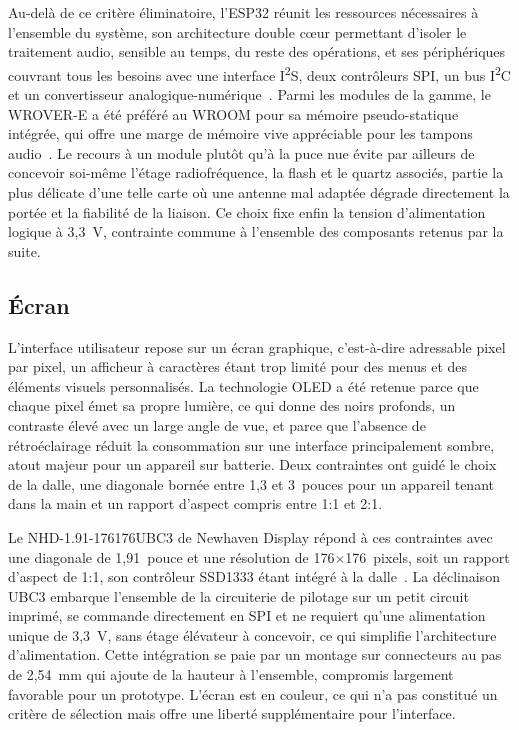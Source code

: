 Au-delà de ce critère éliminatoire, l'ESP32 réunit les ressources nécessaires à l'ensemble du système, son architecture double cœur permettant d'isoler le traitement audio, sensible au temps, du reste des opérations, et ses périphériques couvrant tous les besoins avec une interface I\textsuperscript{2}S, deux contrôleurs SPI, un bus I\textsuperscript{2}C et un convertisseur analogique-numérique~\cite{ESP32_Datasheet}. Parmi les modules de la gamme, le WROVER-E a été préféré au WROOM pour sa mémoire pseudo-statique intégrée, qui offre une marge de mémoire vive appréciable pour les tampons audio~\cite{ESP32_WROVER-E_Datasheet}. Le recours à un module plutôt qu'à la puce nue évite par ailleurs de concevoir soi-même l'étage radiofréquence, la flash et le quartz associés, partie la plus délicate d'une telle carte où une antenne mal adaptée dégrade directement la portée et la fiabilité de la liaison. Ce choix fixe enfin la tension d'alimentation logique à 3,3~V, contrainte commune à l'ensemble des composants retenus par la suite.






\subsection{Écran}

L'interface utilisateur repose sur un écran graphique, c'est-à-dire adressable pixel par pixel, un afficheur à caractères étant trop limité pour des menus et des éléments visuels personnalisés. La technologie OLED a été retenue parce que chaque pixel émet sa propre lumière, ce qui donne des noirs profonds, un contraste élevé avec un large angle de vue, et parce que l'absence de rétroéclairage réduit la consommation sur une interface principalement sombre, atout majeur pour un appareil sur batterie. Deux contraintes ont guidé le choix de la dalle, une diagonale bornée entre 1,3 et 3~pouces pour un appareil tenant dans la main et un rapport d'aspect compris entre 1:1 et 2:1.

Le NHD-1.91-176176UBC3 de Newhaven Display répond à ces contraintes avec une diagonale de 1,91~pouce et une résolution de 176$\times$176~pixels, soit un rapport d'aspect de 1:1, son contrôleur SSD1333 étant intégré à la dalle~\cite{NHD-1.91-176176UBC3}. La déclinaison UBC3 embarque l'ensemble de la circuiterie de pilotage sur un petit circuit imprimé, se commande directement en SPI et ne requiert qu'une alimentation unique de 3,3~V, sans étage élévateur à concevoir, ce qui simplifie l'architecture d'alimentation. Cette intégration se paie par un montage sur connecteurs au pas de 2,54~mm qui ajoute de la hauteur à l'ensemble, compromis largement favorable pour un prototype. L'écran est  en couleur, ce qui n'a pas constitué un critère de sélection mais offre une liberté supplémentaire pour l'interface.




